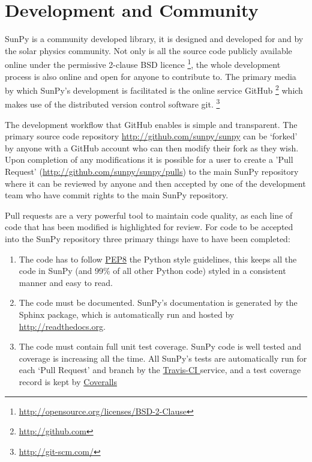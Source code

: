 \section{Development and Community}
SunPy is a community developed library, it is designed and developed for and by 
the solar physics community. Not only is all the source code publicly available 
online under the permissive 2-clause BSD licence 
\footnote{\url{http://opensource.org/licenses/BSD-2-Clause}}, the whole 
development 
process is also online and open for anyone to contribute to.
The primary media by which SunPy's development is facilitated is the online 
service GitHub \footnote{\url{http://github.com}} which makes use of the 
distributed 
version control software git. \footnote{\url{http://git-scm.com/}}

The development workflow that GitHub enables is simple and transparent. The 
primary source code repository \url{http://github.com/sunpy/sunpy} can be 
`forked' by anyone with a GitHub account who can then modify their fork as they 
wish. Upon completion of any modifications it is possible for a user to create 
a 'Pull Request' (\url{http://github.com/sunpy/sunpy/pulls}) to the main SunPy 
repository where it can be reviewed by anyone and then accepted by one of the 
development team who have commit rights to the main SunPy repository.

Pull requests are a very powerful tool to maintain code quality, as each line 
of code that has been modified is highlighted for review. For code to be 
accepted into the SunPy repository three primary things have to have been 
completed:

\begin{enumerate}
	\item  The code has to follow 	
	\href{http://www.python.org/dev/peps/pep-0008/}{PEP8} the Python style 
	guidelines, this keeps all the code in SunPy (and 99\% of all other Python 
	code) styled in a consistent manner and easy to read.
	
	\item The code must be documented. SunPy's documentation is generated by 
	the Sphinx package, which is automatically run and hosted by 
	\url{http://readthedocs.org}.
	
	\item The code must contain full unit test coverage. SunPy code is well 
	tested and coverage is increasing all the time. All SunPy's tests are 
	automatically run for each `Pull Request' and branch by the 
	\href{http://travis-ci.org/sunpy/sunpy}{Travis-CI }	service, and a test 
	coverage record is kept by 
	\href{http://coveralls.io/r/sunpy/sunpy}{Coveralls}
\end{enumerate}

